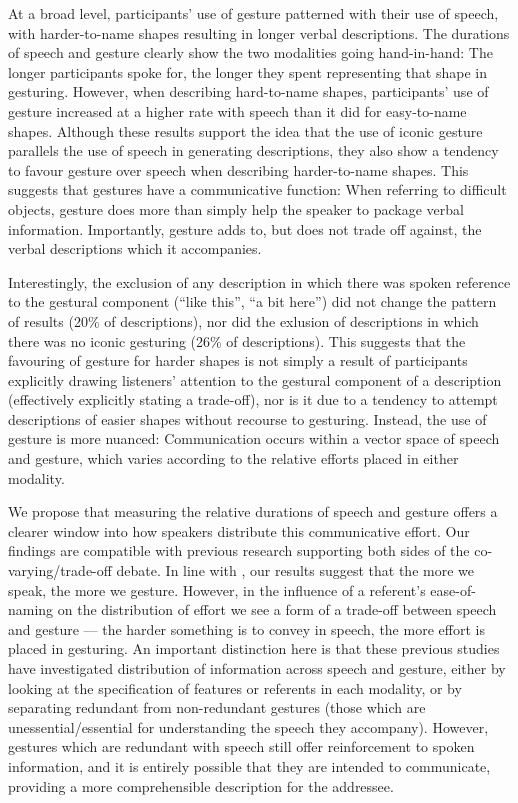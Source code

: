 \documentclass[a4paper,man,natbib]{apa6}
\newcommand*{\spex}[1]{``{#1}''} %
\begin{document}
At a broad level, participants' use of gesture patterned with their use of speech, with harder-to-name shapes resulting in longer verbal descriptions. 
The durations of speech and gesture clearly show the two modalities going hand-in-hand: The longer participants spoke for, the longer they spent representing that shape in gesturing.
However, when describing hard-to-name shapes, participants' use of gesture increased at a higher rate with speech than it did for easy-to-name shapes.
Although these results support the idea that the use of iconic gesture parallels the use of speech in generating descriptions, they also show a tendency to favour gesture over speech when describing harder-to-name shapes.
This suggests that gestures have a communicative function: When referring to difficult objects, gesture does more than simply help the speaker to package verbal information.
Importantly, gesture adds to, but does not trade off against, the verbal descriptions which it accompanies.

Interestingly, the exclusion of any description in which there was spoken reference to the gestural component (\spex{like this}, \spex{a bit here}) did not change the pattern of results (20\% of descriptions), nor did the exlusion of descriptions in which there was no iconic gesturing (26\% of descriptions).
This suggests that the favouring of gesture for harder shapes is not simply a result of participants explicitly drawing listeners' attention to the gestural component of a description (effectively explicitly stating a trade-off), nor is it due to a tendency to attempt descriptions of easier shapes without recourse to gesturing. 
Instead, the use of gesture is more nuanced: Communication occurs within a vector space of speech and gesture, which varies according to the relative efforts placed in either modality.

We propose that measuring the relative durations of speech and gesture offers a clearer window into how speakers distribute this communicative effort.
Our findings are compatible with previous research supporting both sides of the co-varying/trade-off debate.
In line with \citet{So2009}, our results suggest that the more we speak, the more we gesture.
However, in the influence of a referent's ease-of-naming on the distribution of effort we see a form of a trade-off between speech and gesture --- the harder something is to convey in speech, the more effort is placed in gesturing.
An important distinction here is that these previous studies have investigated distribution of information across speech and gesture, either by looking at the specification of features or referents in each modality, or by separating redundant from non-redundant gestures (those which are unessential/essential for understanding the speech they accompany).
However, gestures which are redundant with speech still offer reinforcement to spoken information, and it is entirely possible that they are intended to communicate, providing a more comprehensible description for the addressee.
\end{document}

